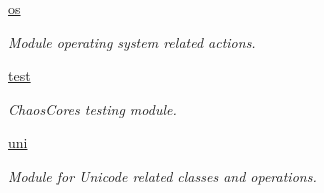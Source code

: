 \begin{DoxyCompactItemize}
 \hyperlink{namespacechaos_1_1os}{os}
\begin{DoxyCompactList}\small\item\em Module operating system related actions. \end{DoxyCompactList}\item 
 \hyperlink{namespacechaos_1_1test}{test}
\begin{DoxyCompactList}\small\item\em Chaos\+Core\textquotesingle{}s testing module. \end{DoxyCompactList}\item 
 \hyperlink{namespacechaos_1_1uni}{uni}
\begin{DoxyCompactList}\small\item\em Module for Unicode related classes and operations. \end{DoxyCompactList}\end{DoxyCompactItemize}
